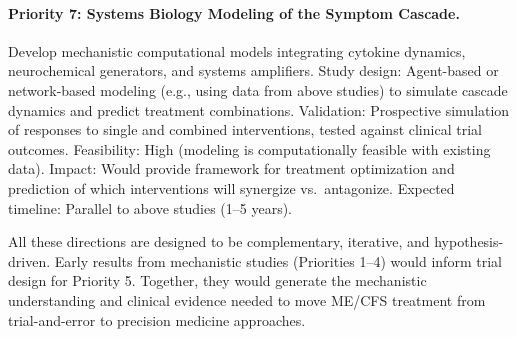 \paragraph{Priority 7: Systems Biology Modeling of the Symptom Cascade.}
Develop mechanistic computational models integrating cytokine dynamics, neurochemical generators, and systems amplifiers. Study design: Agent-based or network-based modeling (e.g., using data from above studies) to simulate cascade dynamics and predict treatment combinations. Validation: Prospective simulation of responses to single and combined interventions, tested against clinical trial outcomes. Feasibility: High (modeling is computationally feasible with existing data). Impact: Would provide framework for treatment optimization and prediction of which interventions will synergize vs.~antagonize. Expected timeline: Parallel to above studies (1--5 years).

All these directions are designed to be complementary, iterative, and hypothesis-driven. Early results from mechanistic studies (Priorities 1--4) would inform trial design for Priority 5. Together, they would generate the mechanistic understanding and clinical evidence needed to move ME/CFS treatment from trial-and-error to precision medicine approaches.

